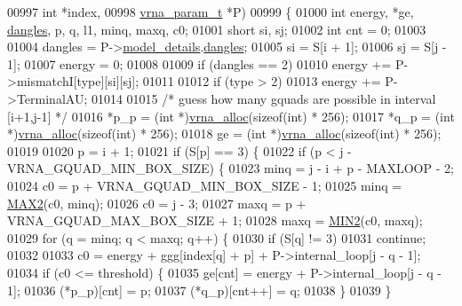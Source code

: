 \begin{DoxyCode}
00997                            \textcolor{keywordtype}{int}          *index,
00998                            \hyperlink{group__energy__parameters_structvrna__param__s}{vrna\_param\_t} *P)
00999 \{
01000   \textcolor{keywordtype}{int}   energy, *ge, \hyperlink{group__model__details_ga72b511ed1201f7e23ec437e468790d74}{dangles}, p, q, l1, minq, maxq, c0;
01001   \textcolor{keywordtype}{short} si, sj;
01002   \textcolor{keywordtype}{int}   cnt = 0;
01003 
01004   dangles = P->\hyperlink{group__energy__parameters_a7b84353eb9075c595bad4ceb871bcae7}{model\_details}.\hyperlink{group__model__details_adcda4ff2ea77748ae0e8700288282efc}{dangles};
01005   si      = S[i + 1];
01006   sj      = S[j - 1];
01007   energy  = 0;
01008 
01009   \textcolor{keywordflow}{if} (dangles == 2)
01010     energy += P->mismatchI[type][si][sj];
01011 
01012   \textcolor{keywordflow}{if} (type > 2)
01013     energy += P->TerminalAU;
01014 
01015   \textcolor{comment}{/* guess how many gquads are possible in interval [i+1,j-1] */}
01016   *p\_p  = (\textcolor{keywordtype}{int} *)\hyperlink{group__utils_gaf37a0979367c977edfb9da6614eebe99}{vrna\_alloc}(\textcolor{keyword}{sizeof}(\textcolor{keywordtype}{int}) * 256);
01017   *q\_p  = (\textcolor{keywordtype}{int} *)\hyperlink{group__utils_gaf37a0979367c977edfb9da6614eebe99}{vrna\_alloc}(\textcolor{keyword}{sizeof}(\textcolor{keywordtype}{int}) * 256);
01018   ge    = (\textcolor{keywordtype}{int} *)\hyperlink{group__utils_gaf37a0979367c977edfb9da6614eebe99}{vrna\_alloc}(\textcolor{keyword}{sizeof}(\textcolor{keywordtype}{int}) * 256);
01019 
01020   p = i + 1;
01021   \textcolor{keywordflow}{if} (S[p] == 3) \{
01022     \textcolor{keywordflow}{if} (p < j - VRNA\_GQUAD\_MIN\_BOX\_SIZE) \{
01023       minq  = j - i + p - MAXLOOP - 2;
01024       c0    = p + VRNA\_GQUAD\_MIN\_BOX\_SIZE - 1;
01025       minq  = \hyperlink{group__utils_ga33297b3679c713b0c4d897cd0fe3b122}{MAX2}(c0, minq);
01026       c0    = j - 3;
01027       maxq  = p + VRNA\_GQUAD\_MAX\_BOX\_SIZE + 1;
01028       maxq  = \hyperlink{group__utils_gae0b9cd0ce090bd69b951aa73e8fa4f7d}{MIN2}(c0, maxq);
01029       \textcolor{keywordflow}{for} (q = minq; q < maxq; q++) \{
01030         \textcolor{keywordflow}{if} (S[q] != 3)
01031           \textcolor{keywordflow}{continue};
01032 
01033         c0 = energy + ggg[index[q] + p] + P->internal\_loop[j - q - 1];
01034         \textcolor{keywordflow}{if} (c0 <= threshold) \{
01035           ge[cnt]       = energy + P->internal\_loop[j - q - 1];
01036           (*p\_p)[cnt]   = p;
01037           (*q\_p)[cnt++] = q;
01038         \}
01039       \}

\end{DoxyCode}
